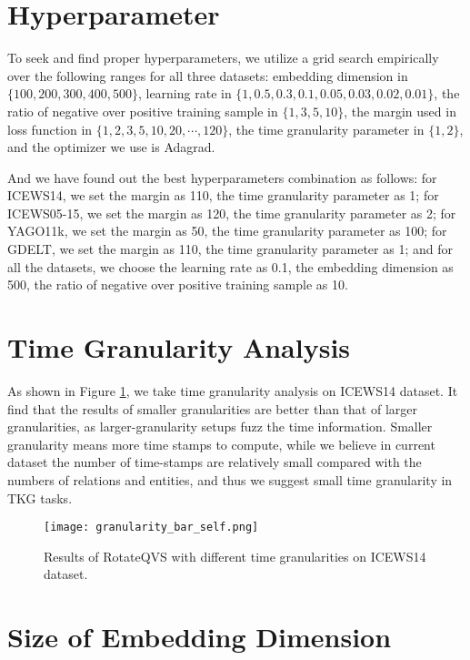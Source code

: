\documentclass[11pt]{article}
\begin{document}
\section{Hyperparameter}
\label{app:hyperparameter}
To seek and find proper hyperparameters, we utilize a grid search empirically over the following ranges for all three datasets: embedding dimension in $\{100, 200, 300, 400, 500\}$, learning rate in $\{1, 0.5, 0.3, 0.1, 0.05, 0.03, 0.02, 0.01\}$, the ratio of negative over positive training sample in $\{1, 3, 5, 10\}$, the margin used in loss function in $\{1, 2, 3, 5, 10, 20, \cdots, 120\}$,  the time granularity parameter in $\{1, 2\}$, and the optimizer we use is Adagrad.

And we have found out the best hyperparameters combination as follows: for ICEWS14, we set the margin as 110, the time granularity parameter as 1; for ICEWS05-15, we set the margin as 120, the time granularity parameter as 2; for YAGO11k, we set the margin as 50, the time granularity parameter as 100; for GDELT, we set the margin as 110, the time granularity parameter as 1; and for all the datasets, we choose the learning rate as 0.1, the embedding dimension as 500, the ratio of negative over positive training sample as 10.


\section{Time Granularity Analysis}
\label{app:time_granularity}
As shown in Figure \ref{figure:granularity}, we take time granularity analysis on ICEWS14 dataset.
It find that the results of smaller granularities are better than that of larger granularities, as larger-granularity setups fuzz the time information.
Smaller granularity means more time stamps to compute, while we believe in current dataset the number of time-stamps are relatively small compared with the numbers of relations and entities, and thus we suggest small time granularity in TKG tasks.

\begin{figure}[!t]
\centering
\texttt{[image: granularity\_bar\_self.png]} 
\caption{Results of RotateQVS with different time granularities on ICEWS14 dataset.}
\label{figure:granularity}
\end{figure}

\section{Size of Embedding Dimension}
\label{app:dimension}
\end{document}
